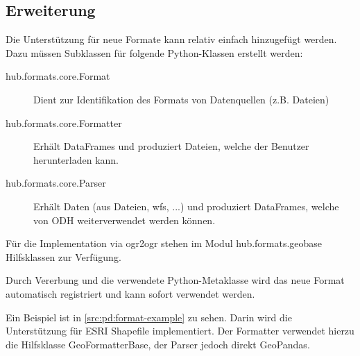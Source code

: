 \subsection{Erweiterung}
Die Unterstützung für neue Formate kann relativ einfach hinzugefügt werden. Dazu müssen Subklassen für folgende Python-Klassen erstellt werden:

\begin{description}
\item[hub.formats.core.Format] Dient zur Identifikation des Formats von Datenquellen (z.B. Dateien)
\item[hub.formats.core.Formatter] Erhält DataFrames und produziert Dateien, welche der Benutzer herunterladen kann.
\item[hub.formats.core.Parser] Erhält Daten (aus Dateien, \acs{wfs}, ...) und produziert DataFrames, welche von ODH weiterverwendet werden können.
\end{description}

Für die Implementation via ogr2ogr stehen im Modul hub.formats.geobase Hilfsklassen zur Verfügung.

Durch Vererbung und die verwendete Python-Metaklasse wird das neue Format automatisch registriert und kann sofort verwendet werden.

Ein Beispiel ist in \cref{src:pd:format-example} zu sehen. Darin wird die Unterstützung für ESRI Shapefile implementiert. Der Formatter verwendet hierzu die Hilfsklasse GeoFormatterBase, der Parser jedoch direkt GeoPandas.

